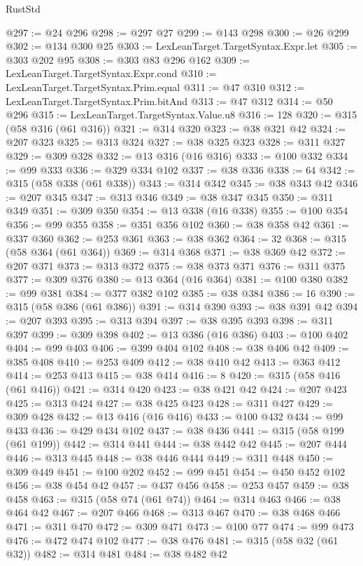\begin{lexlean}{RustStd}
\begin{coremodule}
@297 := @24 @296
@298 := @297 @27
@299 := @143 @298
@300 := @26 @299
@302 := @134 @300 @25
@303 := LexLeanTarget.TargetSyntax.Expr.let
@305 := @303 @202 @95
@308 := @303 @83 @296 @162
@309 := LexLeanTarget.TargetSyntax.Expr.cond
@310 := LexLeanTarget.TargetSyntax.Prim.equal
@311 := @47 @310
@312 := LexLeanTarget.TargetSyntax.Prim.bitAnd
@313 := @47 @312
@314 := @50 @296
@315 := LexLeanTarget.TargetSyntax.Value.u8
@316 := 128
@320 := @315 (@58 @316 (@61 @316))
@321 := @314 @320
@323 := @38 @321 @42
@324 := @207 @323
@325 := @313 @324
@327 := @38 @325 @323
@328 := @311 @327
@329 := @309 @328
@332 := @13 @316 (@16 @316)
@333 := @100 @332
@334 := @99 @333
@336 := @329 @334 @102
@337 := @38 @336
@338 := 64
@342 := @315 (@58 @338 (@61 @338))
@343 := @314 @342
@345 := @38 @343 @42
@346 := @207 @345
@347 := @313 @346
@349 := @38 @347 @345
@350 := @311 @349
@351 := @309 @350
@354 := @13 @338 (@16 @338)
@355 := @100 @354
@356 := @99 @355
@358 := @351 @356 @102
@360 := @38 @358 @42
@361 := @337 @360
@362 := @253 @361
@363 := @38 @362
@364 := 32
@368 := @315 (@58 @364 (@61 @364))
@369 := @314 @368
@371 := @38 @369 @42
@372 := @207 @371
@373 := @313 @372
@375 := @38 @373 @371
@376 := @311 @375
@377 := @309 @376
@380 := @13 @364 (@16 @364)
@381 := @100 @380
@382 := @99 @381
@384 := @377 @382 @102
@385 := @38 @384
@386 := 16
@390 := @315 (@58 @386 (@61 @386))
@391 := @314 @390
@393 := @38 @391 @42
@394 := @207 @393
@395 := @313 @394
@397 := @38 @395 @393
@398 := @311 @397
@399 := @309 @398
@402 := @13 @386 (@16 @386)
@403 := @100 @402
@404 := @99 @403
@406 := @399 @404 @102
@408 := @38 @406 @42
@409 := @385 @408
@410 := @253 @409
@412 := @38 @410 @42
@413 := @363 @412
@414 := @253 @413
@415 := @38 @414
@416 := 8
@420 := @315 (@58 @416 (@61 @416))
@421 := @314 @420
@423 := @38 @421 @42
@424 := @207 @423
@425 := @313 @424
@427 := @38 @425 @423
@428 := @311 @427
@429 := @309 @428
@432 := @13 @416 (@16 @416)
@433 := @100 @432
@434 := @99 @433
@436 := @429 @434 @102
@437 := @38 @436
@441 := @315 (@58 @199 (@61 @199))
@442 := @314 @441
@444 := @38 @442 @42
@445 := @207 @444
@446 := @313 @445
@448 := @38 @446 @444
@449 := @311 @448
@450 := @309 @449
@451 := @100 @202
@452 := @99 @451
@454 := @450 @452 @102
@456 := @38 @454 @42
@457 := @437 @456
@458 := @253 @457
@459 := @38 @458
@463 := @315 (@58 @74 (@61 @74))
@464 := @314 @463
@466 := @38 @464 @42
@467 := @207 @466
@468 := @313 @467
@470 := @38 @468 @466
@471 := @311 @470
@472 := @309 @471
@473 := @100 @77
@474 := @99 @473
@476 := @472 @474 @102
@477 := @38 @476
@481 := @315 (@58 @32 (@61 @32))
@482 := @314 @481
@484 := @38 @482 @42

\end{coremodule}
\end{lexlean}
